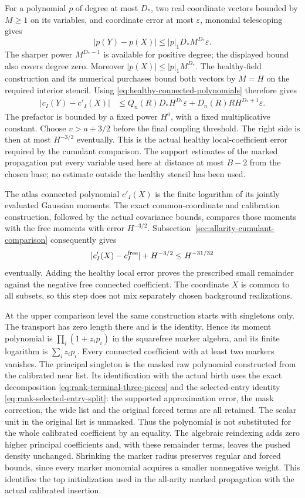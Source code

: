 For a polynomial $p$ of degree at most $D_*$, two real coordinate
vectors bounded by $M\ge1$ on its variables, and coordinate error
at most $\varepsilon$, monomial telescoping gives
\[
 |p(Y)-p(X)|\le |p|_1D_*M^{D_*}\varepsilon.
\]
The sharper power $M^{D_*-1}$ is available for positive degree;
the displayed bound also covers degree zero. Moreover
$|p(X)|\le |p|_1M^{D_*}$.
The healthy-field construction and its numerical purchases bound
both vectors by $M=H$ on the required interior stencil.
Using \eqref{eq:healthy-connected-polynomials} therefore gives
\begin{align*}
 |c_I(Y)-c'_I(X)|
 &\le Q_n(R)D_*H^{D_*}\varepsilon
       +D_n(R)RH^{D_*+1}\varepsilon.
\end{align*}
The prefactor is bounded by a fixed power $H^a$, with a fixed
multiplicative constant. Choose $v>a+3/2$ before the final coupling
threshold. The right side is then at most $H^{-3/2}$ eventually.
This is the actual healthy local-coefficient error required by the
cumulant comparison. The support estimates of the marked propagation
put every variable used here at distance at most $B-2$ from the
chosen base; no estimate outside the healthy stencil has been used.

The atlas connected polynomial $c'_I(X)$ is the finite logarithm
of its jointly evaluated Gaussian moments. The exact common-coordinate
and calibration construction, followed by the actual covariance bounds,
compares those moments with the free moments with error $H^{-3/2}$.
Subsection~\ref{sec:allarity-cumulant-comparison} consequently gives
\[
 |c'_I(X)-c_I^{\rm free}|+H^{-3/2}\le H^{-31/32}
\]
eventually. Adding the healthy local error proves the prescribed
small remainder against the negative free connected coefficient.
The coordinate $X$ is common to all subsets, so this step does not
mix separately chosen background realizations.

At the upper comparison level the same construction starts with
singletons only. The transport has zero length there and is the
identity. Hence its moment polynomial is
$\prod_i(1+z_ip_i)$ in the squarefree marker algebra, and its
finite logarithm is $\sum_i z_ip_i$. Every connected coefficient
with at least two markers vanishes. The principal singleton is the
masked raw polynomial constructed from the calibrated near list.
Its identification with the actual birth uses the exact decomposition
\eqref{eq:rank-terminal-three-pieces} and the selected-entry identity
\eqref{eq:rank-selected-entry-split}: the supported approximation
error, the mask correction, the wide list and the original forced
terms are all retained. The scalar unit in the original list is
unmasked. Thus the polynomial is not substituted for the whole
calibrated coefficient by an equality. The algebraic reindexing
adds zero higher principal coefficients and, with these remainder
terms, leaves the pushed density unchanged.
Shrinking the marker radius preserves regular and forced bounds,
since every marker monomial acquires a smaller nonnegative weight.
This identifies the top initialization used in the all-arity marked
propagation with the actual calibrated insertion.


